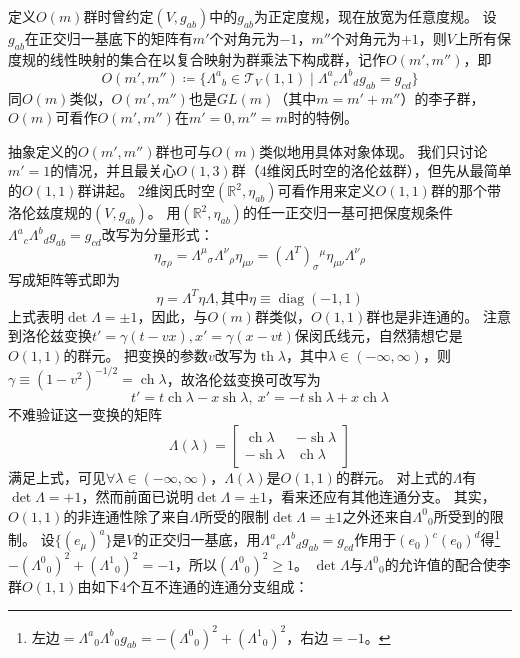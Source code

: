 定义$O(m)$群时曾约定$(V, g_{ab})$中的$g_{ab}$为正定度规，现在放宽为任意度规。
设$g_{ab}$在正交归一基底下的矩阵有$m'$个对角元为$-1$，$m''$个对角元为$+1$，则$V$上所有保度规的线性映射的集合在以复合映射为群乘法下构成群，记作$O(m', m'')$，即
$$O(m', m'') \coloneq \{\Lambda^a{}_b \in \mathscr{T}_V(1, 1) \mid \Lambda^a{}_c\Lambda^b{}_dg_{ab} = g_{cd}\}$$
同$O(m)$类似，$O(m', m'')$也是$GL(m)$（其中$m = m' + m''$）的李子群，$O(m)$可看作$O(m', m'')$在$m' = 0, m'' = m$时的特例。

抽象定义的$O(m', m'')$群也可与$O(m)$类似地用具体对象体现。
我们只讨论$m' = 1$的情况，并且最关心$O(1, 3)$群（$4$维闵氏时空的洛伦兹群），但先从最简单的$O(1, 1)$群讲起。
$2$维闵氏时空$(\mathbb{R}^2, \eta_{ab})$可看作用来定义$O(1, 1)$群的那个带洛伦兹度规的$(V, g_{ab})$。
用$(\mathbb{R}^2, \eta_{ab})$的任一正交归一基可把保度规条件$\Lambda^a{}_c\Lambda^b{}_dg_{ab} = g_{cd}$改写为分量形式：
$$\eta_{\sigma\rho} = \Lambda^\mu{}_\sigma\Lambda^\nu{}_\rho\eta_{\mu\nu} = (\Lambda^T)_\sigma{}^\mu\eta_{\mu\nu}\Lambda^\nu{}_\rho$$
写成矩阵等式即为
$$\eta = \Lambda^T\eta\Lambda, \text{其中} \eta \equiv \operatorname{diag}(-1, 1)$$
上式表明$\det \Lambda = \pm 1$，因此，与$O(m)$群类似，$O(1, 1)$群也是非连通的。
注意到洛伦兹变换$t' = \gamma(t - vx), x' = \gamma(x - vt)$保闵氏线元，自然猜想它是$O(1, 1)$的群元。
把变换的参数$v$改写为$\operatorname{th}\lambda$，其中$\lambda \in (-\infty, \infty)$，则$\gamma \equiv (1 - v^2)^{-1/2} = \operatorname{ch}\lambda$，故洛伦兹变换可改写为
$$t' = t\operatorname{ch}\lambda - x\operatorname{sh}\lambda, ~ x' = -t\operatorname{sh}\lambda + x\operatorname{ch}\lambda$$
不难验证这一变换的矩阵
$$\Lambda(\lambda) = \begin{bmatrix}
    \operatorname{ch}\lambda & -\operatorname{sh}\lambda \\
    -\operatorname{sh}\lambda & \operatorname{ch}\lambda
\end{bmatrix}$$
满足上式，可见$\forall \lambda \in (-\infty, \infty)$，$\Lambda(\lambda)$是$O(1, 1)$的群元。
对上式的$\Lambda$有$\det \Lambda = +1$，然而前面已说明$\det \Lambda = \pm 1$，看来还应有其他连通分支。
其实，$O(1, 1)$的非连通性除了来自$\Lambda$所受的限制$\det \Lambda = \pm 1$之外还来自$\Lambda^0{}_0$所受到的限制。
设$\{(e_\mu)^a\}$是$V$的正交归一基底，用$\Lambda^a{}_c\Lambda^b{}_dg_{ab} = g_{cd}$作用于$(e_0)^c(e_0)^d$得\footnote{
    左边$= \Lambda^a{}_0\Lambda^b{}_0g_{ab} = -(\Lambda^0{}_0)^2 + (\Lambda^1{}_0)^2$，右边$= -1$。
}$-(\Lambda^0{}_0)^2 + (\Lambda^1{}_0)^2 = -1$，所以$(\Lambda^0{}_0)^2 \geq 1$。
$\det \Lambda$与$\Lambda^0{}_0$的允许值的配合使李群$O(1, 1)$由如下$4$个互不连通的连通分支组成：
